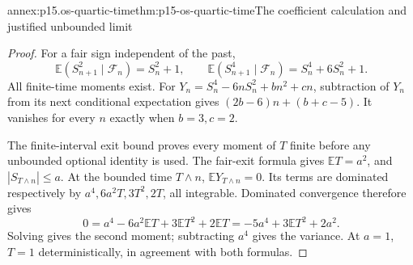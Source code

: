 \begin{annexitem}{annex:p15.os-quartic-time}{thm:p15-os-quartic-time}{The coefficient calculation and justified unbounded limit}
\begin{proof}
For a fair sign independent of the past,
\[
 \mathbb E(S_{n+1}^2\mid\mathcal F_n)=S_n^2+1,\qquad
 \mathbb E(S_{n+1}^4\mid\mathcal F_n)=S_n^4+6S_n^2+1.
 \]
All finite-time moments exist. For
\(Y_n=S_n^4-6nS_n^2+bn^2+cn\), subtraction of \(Y_n\)
from its next conditional expectation gives
\((2b-6)n+(b+c-5)\).
It vanishes for every \(n\) exactly when \(b=3,c=2\).

The finite-interval exit bound proves every moment of \(T\)
finite before any unbounded optional identity is used.
The fair-exit formula gives \(\mathbb ET=a^2\), and
\(|S_{T\wedge n}|\leq a\).
At the bounded time \(T\wedge n\), \(\mathbb EY_{T\wedge n}=0\).
Its terms are dominated respectively by
\(a^4,6a^2T,3T^2,2T\), all integrable.
Dominated convergence therefore gives
\[
 0=a^4-6a^2\mathbb ET+3\mathbb ET^2+2\mathbb ET
   =-5a^4+3\mathbb ET^2+2a^2.
 \]
Solving gives the second moment; subtracting \(a^4\)
gives the variance. At \(a=1\), \(T=1\) deterministically,
in agreement with both formulas.
\end{proof}
\end{annexitem}

